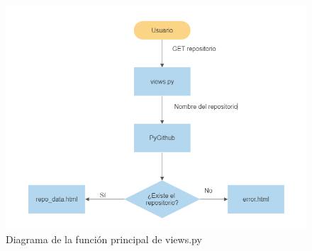 \documentclass[a4paper, 12pt]{book}
\begin{document}
\begin{figure}
    \centering
    \includegraphics[width=1\textwidth, keepaspectratio]{img/diagrama_views.png}
    \caption{Diagrama de la función principal de views.py}\label{fig:diagrama views.py}
\end{figure}
\end{document}
